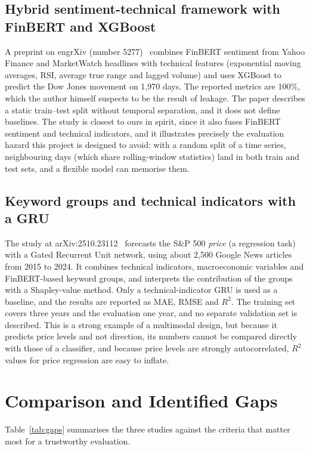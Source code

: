 \subsection{Hybrid sentiment-technical framework with FinBERT and XGBoost}
A preprint on engrXiv (number 5277)~\cite{hybridfinbert} combines FinBERT sentiment from Yahoo Finance and MarketWatch headlines with technical features (exponential moving averages, RSI, average true range and lagged volume) and uses XGBoost to predict the Dow Jones movement on 1,970 days. The reported metrics are 100\%, which the author himself suspects to be the result of leakage. The paper describes a static train--test split without temporal separation, and it does not define baselines. The study is closest to ours in spirit, since it also fuses FinBERT sentiment and technical indicators, and it illustrates precisely the evaluation hazard this project is designed to avoid: with a random split of a time series, neighbouring days (which share rolling-window statistics) land in both train and test sets, and a flexible model can memorise them.

\subsection{Keyword groups and technical indicators with a GRU}
The study at arXiv:2510.23112~\cite{groupshap2025} forecasts the S\&P 500 \emph{price} (a regression task) with a Gated Recurrent Unit network, using about 2,500 Google News articles from 2015 to 2024. It combines technical indicators, macroeconomic variables and FinBERT-based keyword groups, and interprets the contribution of the groups with a Shapley-value method. Only a technical-indicator GRU is used as a baseline, and the results are reported as MAE, RMSE and $R^2$. The training set covers three years and the evaluation one year, and no separate validation set is described. This is a strong example of a multimodal design, but because it predicts price levels and not direction, its numbers cannot be compared directly with those of a classifier, and because price levels are strongly autocorrelated, $R^2$ values for price regression are easy to inflate.

\section{Comparison and Identified Gaps}
Table~\ref{tab:gaps} summarises the three studies against the criteria that matter most for a trustworthy evaluation.

